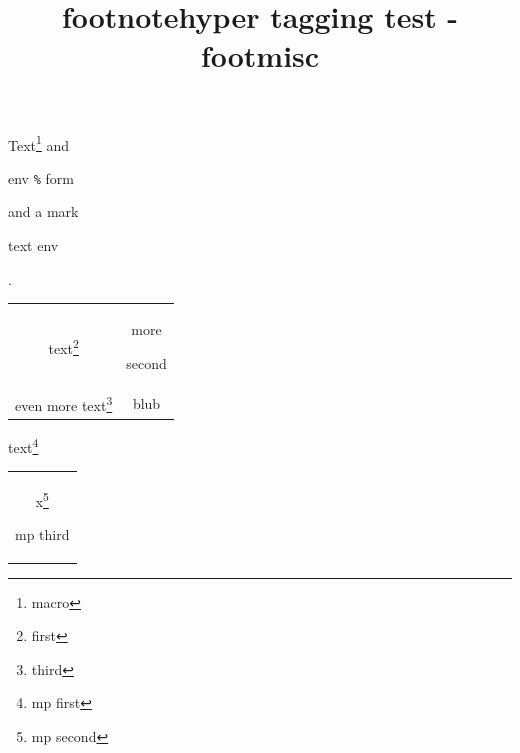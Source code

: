 \documentclass{article}
\title{footnotehyper tagging test - footmisc}
\begin{document}
Text\footnote{macro} and\begin{footnote}env \verb|%| form\end{footnote} and a
mark\footnotemark\begin{footnotetext}text env\end{footnotetext}.

\begin{savenotes}
\begin{tabular}{cc}
text\footnote{first} & more\begin{footnote}second\end{footnote} \\
even more text\footnote{third} & blub
\end{tabular}
\end{savenotes}

\begin{minipage}{5cm}
text\footnote{mp first}
\begin{savenotes}
\begin{tabular}{c}
x\footnote{mp second}\begin{footnote}mp third\end{footnote}
\end{tabular}
\end{savenotes}
\end{minipage}
\end{document}

